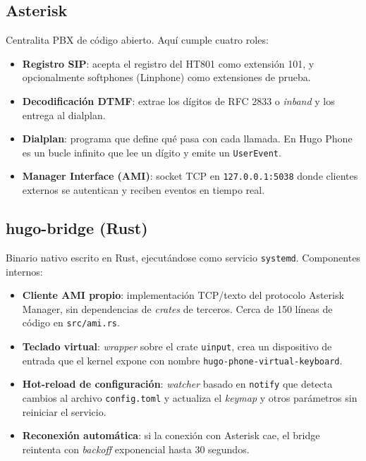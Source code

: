 \subsection{Asterisk}

Centralita PBX de código abierto. Aquí cumple cuatro roles:

\begin{itemize}
  \item \textbf{Registro SIP}: acepta el registro del HT801 como extensión 101, y opcionalmente softphones (Linphone) como extensiones de prueba.
  \item \textbf{Decodificación DTMF}: extrae los dígitos de RFC 2833 o \emph{inband} y los entrega al dialplan.
  \item \textbf{Dialplan}: programa que define qué pasa con cada llamada. En Hugo Phone es un bucle infinito que lee un dígito y emite un \texttt{UserEvent}.
  \item \textbf{Manager Interface (AMI)}: socket TCP en \texttt{127.0.0.1:5038} donde clientes externos se autentican y reciben eventos en tiempo real.
\end{itemize}

\subsection{hugo-bridge (Rust)}

Binario nativo escrito en Rust, ejecutándose como servicio \texttt{systemd}. Componentes internos:

\begin{itemize}
  \item \textbf{Cliente AMI propio}: implementación TCP/texto del protocolo Asterisk Manager, sin dependencias de \emph{crates} de terceros. Cerca de 150 líneas de código en \texttt{src/ami.rs}.
  \item \textbf{Teclado virtual}: \emph{wrapper} sobre el crate \texttt{uinput}, crea un dispositivo de entrada que el kernel expone con nombre \texttt{hugo-phone-virtual-keyboard}.
  \item \textbf{Hot-reload de configuración}: \emph{watcher} basado en \texttt{notify} que detecta cambios al archivo \texttt{config.toml} y actualiza el \emph{keymap} y otros parámetros sin reiniciar el servicio.
  \item \textbf{Reconexión automática}: si la conexión con Asterisk cae, el bridge reintenta con \emph{backoff} exponencial hasta 30 segundos.
\end{itemize}

